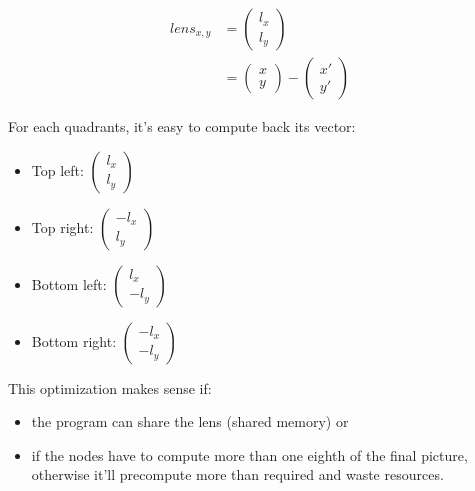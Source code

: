 \documentclass[10pt,a4paper]{article}
\begin{document}
\begin{align*}
lens_{x,y}
    &= \left(\! \begin{array}{c} l_x \\ l_y \end{array} \!\right) \\
    &= \left(\! \begin{array}{c} x \\ y \end{array} \!\right)
    - \left(\! \begin{array}{c} x\prime \\ y\prime \end{array} \!\right)
\end{align*}

For each quadrants, it's easy to compute back its vector:

\begin{itemize}
    \item Top left: $\left(\! \begin{array}{c} l_x \\ l_y \end{array}
    \!\right)$

    \item Top right: $\left(\! \begin{array}{c} -l_x \\ l_y \end{array}
    \!\right)$

    \item Bottom left: $\left(\! \begin{array}{c} l_x \\ -l_y \end{array}
    \!\right)$

    \item Bottom right: $\left(\! \begin{array}{c} -l_x \\ -l_y \end{array}
    \!\right)$

\end{itemize}

This optimization makes sense if:

\begin{itemize}
    \item the program can share the lens (shared memory) or
    \item if the nodes have to compute more than one eighth of the final
    picture, otherwise it'll precompute more than required and waste resources.

\end{itemize}
\end{document}
